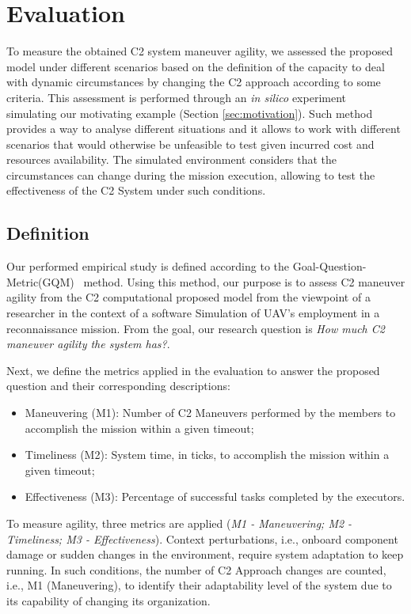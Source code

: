 \section{Evaluation}
\label{sec:evaluation}

To measure the obtained C2 system maneuver agility, we assessed the proposed model under different scenarios based on the definition of the capacity to deal with dynamic circumstances by changing the C2 approach according to some criteria. This assessment is performed through an \textit{in silico} experiment~\cite{simulation01} simulating our motivating example (Section \ref{sec:motivation}). Such method provides a way to analyse different situations and it allows to work with different scenarios that would otherwise be unfeasible to test given incurred cost and resources availability. The simulated environment considers that the circumstances can change during the mission execution, allowing to test the effectiveness of the C2 System under such conditions.
 
\subsection{Definition}
\label{ssec:definition}

Our performed empirical study is defined according to the Goal-Question-Metric(GQM)~\citep{baier} method. Using this method, our purpose is to assess C2 maneuver agility from the C2 computational proposed model from the viewpoint of a researcher in the context of a software Simulation of UAV's employment in a reconnaissance mission. From the goal, our research question is \textit{How much C2 maneuver agility the system has?}. 

Next, we define the metrics applied in the evaluation to answer the proposed question and their corresponding descriptions:
\begin{itemize}
    \item Maneuvering (M1): Number of C2 Maneuvers performed by the members to accomplish the mission within a given timeout;
    \item Timeliness (M2): System time, in ticks, to accomplish the mission within a given timeout;
    \item Effectiveness (M3): Percentage of successful tasks completed by the executors.
\end{itemize}

To measure agility, three metrics are applied (\textit{M1 - Maneuvering; M2 - Timeliness; M3 - Effectiveness}). Context perturbations, i.e., onboard component damage or sudden changes in the environment, require system adaptation to keep running. In such conditions, the number of C2 Approach changes are counted, i.e., M1 (Maneuvering), to identify their adaptability level of the system due to its capability of changing its organization.

